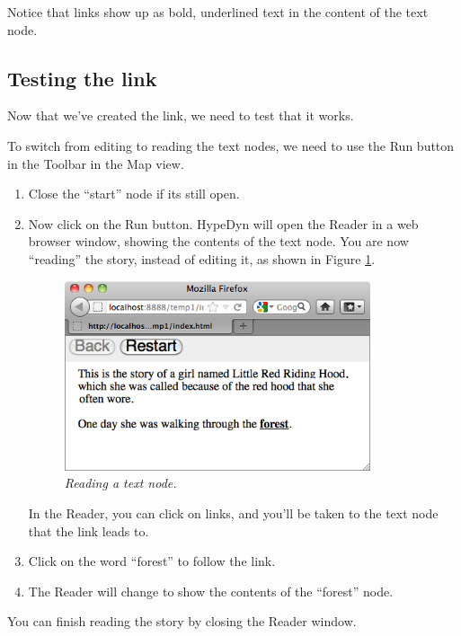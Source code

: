 \documentclass{article}
\begin{document}
Notice that links show up as bold, underlined text in the content of the text node.

\subsection{Testing the link}

Now that we've created the link, we need to test that it works.

To switch from editing to reading the text nodes, we need to use the Run button
in the Toolbar in the Map view.

\begin{enumerate}
  \item Close the ``start'' node if its still open.
  \item Now click on the Run button. HypeDyn will open the Reader in a web
  browser window, showing the contents of the text node. You are now
  ``reading'' the story, instead of editing it, as shown in Figure
  \ref{fig:tut1:reading}.

\begin{figure}[ht]
  \centering
  \includegraphics[width=9cm]{images/hypedyn-tutorial-1-figure-10}
  \caption{\textit{Reading a text node.}}
  \label{fig:tut1:reading}
\end{figure} 

In the Reader, you can click on links, and you'll be taken to the text node
that the link leads to.

\item Click on the word ``forest'' to follow the link.
\item The Reader will change to show the contents of the ``forest'' node.
\end{enumerate}

You can finish reading the story by closing the Reader window.

\end{document}
